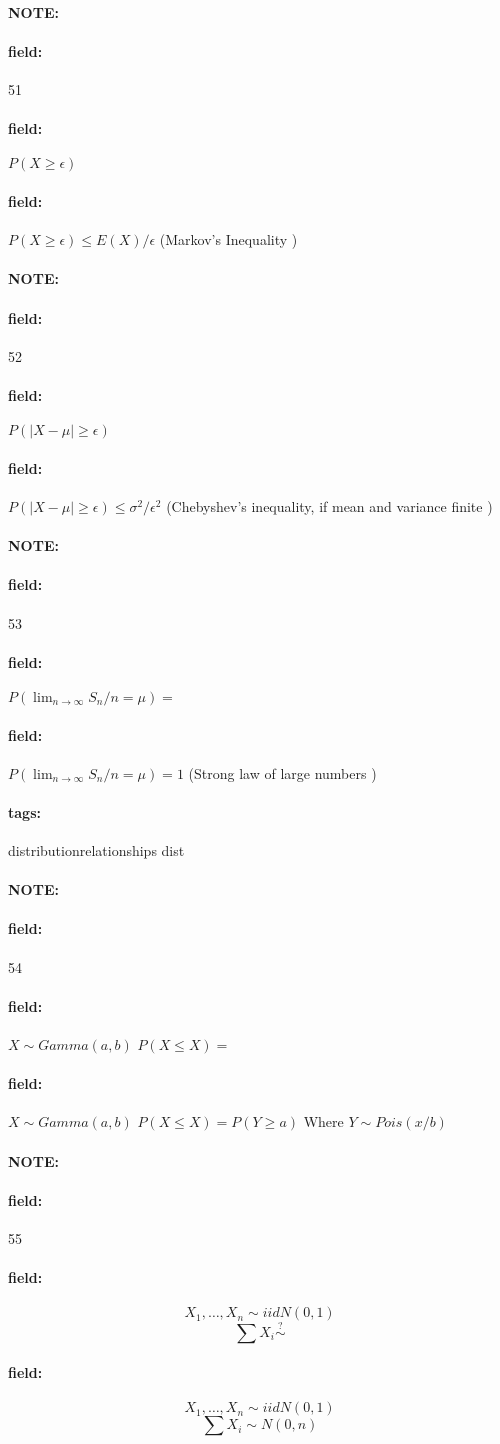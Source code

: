 \documentclass[12pt]{article}
\newenvironment{note}{\paragraph{NOTE:}}{}
\newenvironment{field}{\paragraph{field:}}{}
\newcommand*{\tags}[1]{\paragraph{tags: }#1}
\begin{document}
\begin{note}
  \begin{field}
    \tiny 51
  \end{field}
  \begin{field}
    $P(X \geq \epsilon)$
  \end{field}
  \begin{field}
    $P(X \geq \epsilon) \leq E(X) / \epsilon$ (Markov's Inequality )
  \end{field}
\end{note}

\begin{note}
  \begin{field}
    \tiny 52
  \end{field}
  \begin{field}
    $P(|X-\mu| \geq \epsilon)$
  \end{field}
  \begin{field}
    $P(|X-\mu| \geq \epsilon) \leq \sigma^2/\epsilon^2$ (Chebyshev's inequality, if mean and variance finite )
  \end{field}
\end{note}

\begin{note}
  \begin{field}
    \tiny 53
  \end{field}
  \begin{field}
    $P(\lim_{n\to \infty} S_n/n = \mu) = $
  \end{field}
  \begin{field}
  $P(\lim_{n\to \infty} S_n/n = \mu) = 1$ (Strong law of large numbers )
\end{field}
\end{note}

\tags{distributionrelationships dist}

\begin{note}
  \begin{field}
    \tiny 54
  \end{field}
  \begin{field}
    $X \sim Gamma(a,b)$
    $P(X \leq X) = $
  \end{field}
  \begin{field}
    $X \sim Gamma(a,b)$
    $P(X \leq X) = P(Y \geq a)$
    Where $Y \sim Pois (x/b)$
  \end{field}
\end{note}


\begin{note}
  \begin{field}
    \tiny 55
  \end{field}
  \begin{field}
    $$X_1, \ldots, X_n \sim iid N(0,1)$$
    $$ \sum X_i \overset{?}{\sim}$$
  \end{field}
  \begin{field}
    $$X_1, \ldots, X_n \sim iid N(0,1)$$
    $$ \sum X_i \sim N(0,n)$$
  \end{field}
\end{note}
\end{document}
